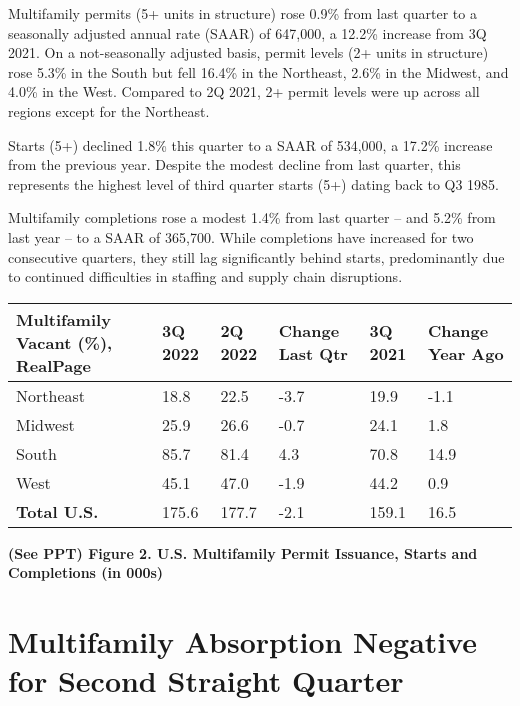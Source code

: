 \documentclass{article}
\begin{document}
Multifamily permits (5+ units in structure) rose 0.9\% from last quarter to a seasonally adjusted annual rate (SAAR) of 647,000, a 12.2\% increase from 3Q 2021. On a not-seasonally adjusted basis, permit levels (2+ units in structure) rose 5.3\% in the South but fell 16.4\% in the Northeast, 2.6\% in the Midwest, and 4.0\% in the West. Compared to 2Q 2021, 2+ permit levels were up across all regions except for the Northeast.

\medskip

\noindent Starts (5+) declined 1.8\% this quarter to a SAAR of 534,000, a 17.2\% increase from the previous year. Despite the modest decline from last quarter, this represents the highest level of third quarter starts (5+) dating back to Q3 1985.

\medskip

\noindent Multifamily completions rose a modest 1.4\% from last quarter $–$ and 5.2\% from last year $–$ to a SAAR of 365,700. While completions have increased for two consecutive quarters, they still lag significantly behind starts, predominantly due to continued difficulties in staffing and supply chain disruptions.  

\begin{center}
    \begin{tabular}{ |p{3cm}||p{1.5cm}|p{1.5cm}|p{1.5cm}|p{1.5cm}|p{1.5cm}|  }
    \hline
     Multifamily Vacant (\%), RealPage & \centering 3Q 2022 & \centering 2Q 2022 & \centering Change Last Qtr & \centering 3Q 2021 & Change Year Ago\\
     \hline
     Northeast & 18.8 & 22.5 & -3.7 & 19.9 & -1.1\\
     \hline
     Midwest & 25.9 & 26.6 & -0.7 & 24.1 & 1.8\\
     \hline
     South & 85.7 & 81.4 & 4.3 & 70.8 & 14.9\\
     \hline
     West & 45.1 & 47.0 & -1.9 & 44.2 & 0.9\\
     \hline
     \textbf{Total U.S.} & 175.6 & 177.7 & -2.1 & 159.1 & 16.5\\
     \hline
    \end{tabular}
    \begin{tablenotes}
        \small
        \item \textbf{(See PPT) Figure 2. U.S. Multifamily Permit Issuance, Starts and Completions (in 000s)}
    \end{tablenotes}
\end{center}

\section*{\normalsize Multifamily Absorption Negative for Second Straight Quarter}
\end{document}
